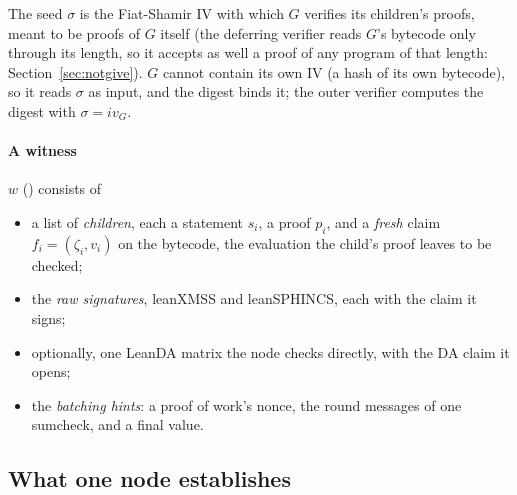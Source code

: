 \documentclass[11pt]{article}
\begin{document}
The seed $\sigma$ is the Fiat-Shamir IV with which $G$ verifies its children's proofs, meant to be
proofs of $G$ itself (the deferring verifier reads $G$'s bytecode only through its length, so it
accepts as well a proof of any program of that length: Section~\ref{sec:notgive}). $G$ cannot contain its own IV (a hash of its own bytecode), so it reads
$\sigma$ as input, and the digest binds it; the outer verifier computes the digest with
$\sigma = iv_G$.

\paragraph{A witness} $w$ () consists of
\begin{itemize}
\item a list of \emph{children}, each a statement $s_i$, a proof $p_i$, and a \emph{fresh} claim
$f_i = (\zeta_i, v_i)$ on the bytecode, the evaluation the child's proof leaves to be checked;
\item the \emph{raw signatures}, leanXMSS and leanSPHINCS, each with the claim it signs;
\item optionally, one LeanDA matrix the node checks directly, with the DA claim it opens;
\item the \emph{batching hints}: a proof of work's nonce, the round messages of one sumcheck, and a final value.
\end{itemize}

\subsection{What one node establishes}
\end{document}
